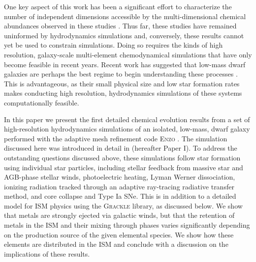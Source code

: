 One key aspect of this work has been a significant effort to characterize the number of independent dimensions accessible by the multi-dimensional chemical abundances observed in these studies \citep[e.g][]{Freeman2002,Ting2012, Hogg2016,Jofre2017,Price-Jones2018}. Thus far, these studies have remained uninformed by hydrodynamics simulations and, conversely, these results cannot yet be used to constrain simulations. Doing so requires the kinds of high resolution, galaxy-scale multi-element chemodynamical simulations that have only become feasible in recent years. Recent work has suggested that low-mass dwarf galaxies are perhaps the best regime to begin understanding these processes \citep[e.g.][]{Bland-Hawthorn2010a,Bland-Hawthorn2010b,Karlsson2012,Webster2016}. This is advantageous, as their small physical size and low star formation rates makes conducting high resolution, hydrodynamics simulations of these systems computationally feasible.

In this paper we present the first detailed chemical evolution results from a set of high-resolution hydrodynamics simulations of an isolated, low-mass, dwarf galaxy performed with the adaptive mesh refinement code \textsc{Enzo} \citep{Enzo2014}. The simulation discussed here was introduced in detail in \cite{Emerick2019} (hereafter Paper I). To address the outstanding questions discussed above, these simulations follow star formation using individual star particles, including stellar feedback from massive star and AGB-phase stellar winds, photoelectric heating, Lyman Werner dissociation, ionizing radiation tracked through an adaptive ray-tracing radiative transfer method, and core collapse and Type Ia SNe. This is in addition to a detailed model for ISM physics using the \textsc{Grackle} library, as discussed below. We show that metals are strongly ejected via galactic winds, but that the retention of metals in the ISM and their mixing through phases varies significantly depending on the production source of the given elemental species. We show how these elements are distributed in the ISM and conclude with a discussion on the implications of these results.

